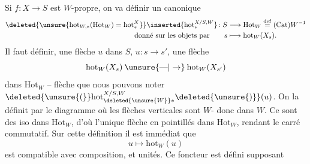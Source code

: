 Si $f\colon X\to S$ est $W$-propre, on va définir un   canonique
\[
\begin{aligned}
\deleted{\unsure{\mathrm{hot}_{W, *}(\mathrm{Hot}_{W})=\mathrm{hot}^{X}_{*}}}
\inserted{\mathrm{hot}^{X/S,W}_{*}}\colon S&\longrightarrow\mathrm{Hot}_W\overset{\mathrm{def}}{=}(\mathrm{Cat})W^{-1}\\
\text{donné sur les objets par}\qquad s&\longmapsto\mathrm{hot}_W(X_s).
\end{aligned}
\]
Il faut définir,  une flèche $u$ dans $S$, $u\colon s\longrightarrow s'$, une flèche
\[
\mathrm{hot}_W(X_s)\mathbin{\unsure{\text{---}|\to}}\mathrm{hot}_W(X_{s'})
\]
dans $\mathrm{Hot}_W$ -- flèche que nous pouvons noter $\deleted{\unsure{(}}\mathrm{hot}_{\deleted{\unsure{W}}*}^{X/S,W}\deleted{\unsure{)}}(u)$. On la définit par le diagramme
où les flèches verticales sont $W$- donc dans $W$. Ce sont  des iso dans $\mathrm{Hot}_W$, d'où l'unique flèche en pointillés dans $\mathrm{Hot}_W$, rendant le carré commutatif. Sur cette définition il est immédiat que
\[
u\longmapsto\mathrm{hot}_W(u)
\]
est compatible avec composition, et unités. Ce foncteur est  défini   supposant



